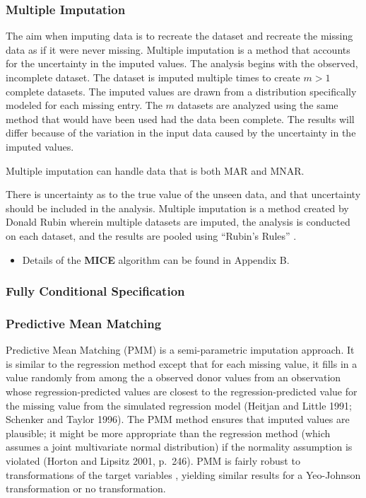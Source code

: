 \documentclass[12pt,]{article}
\providecommand{\tightlist}{%
  \setlength{\itemsep}{0pt}\setlength{\parskip}{0pt}}
\begin{document}
\subsubsection{Multiple Imputation}\label{multiple-imputation}

The aim when imputing data is to recreate the dataset and recreate the
missing data as if it were never missing. Multiple imputation is a
method that accounts for the uncertainty in the imputed values. The
analysis begins with the observed, incomplete dataset. The dataset is
imputed multiple times to create \(m>1\) complete datasets. The imputed
values are drawn from a distribution specifically modeled for each
missing entry. The \(m\) datasets are analyzed using the same method
that would have been used had the data been complete. The results will
differ because of the variation in the input data caused by the
uncertainty in the imputed values.

Multiple imputation can handle data that is both MAR and MNAR.

There is uncertainty as to the true value of the unseen data, and that
uncertainty should be included in the analysis. Multiple imputation is a
method created by Donald Rubin wherein multiple datasets are imputed,
the analysis is conducted on each dataset, and the results are pooled
using ``Rubin's Rules'' \citep{rubin_inference_1976}.

\begin{itemize}
\tightlist
\item
  Details of the \textbf{MICE} algorithm can be found in Appendix B.
\end{itemize}

\subsubsection{Fully Conditional
Specification}\label{fully-conditional-specification}

\subsubsection{Predictive Mean Matching}\label{predictive-mean-matching}

Predictive Mean Matching (PMM) is a semi-parametric imputation approach.
It is similar to the regression method except that for each missing
value, it fills in a value randomly from among the a observed donor
values from an observation whose regression-predicted values are closest
to the regression-predicted value for the missing value from the
simulated regression model (Heitjan and Little 1991; Schenker and Taylor
1996). The PMM method ensures that imputed values are plausible; it
might be more appropriate than the regression method (which assumes a
joint multivariate normal distribution) if the normality assumption is
violated (Horton and Lipsitz 2001, p.~246). PMM is fairly robust to
transformations of the target variables
\citep{van_buuren_flexible_2012}, yielding similar results for a
Yeo-Johnson transformation or no transformation.
\end{document}
